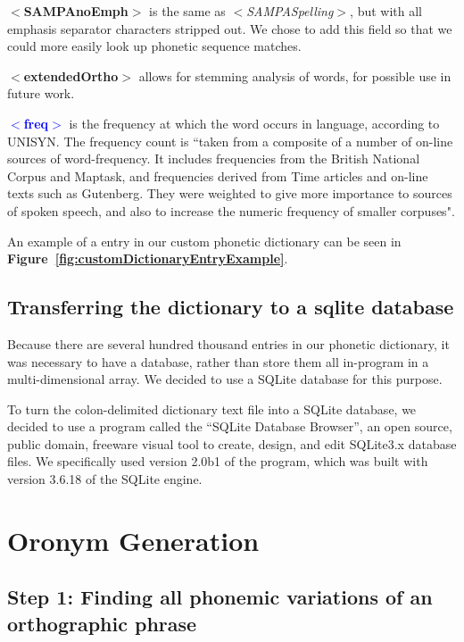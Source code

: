 \textcolor{Rhodamine}{$<$\textbf{SAMPAnoEmph}$>$} is the same as \emph{$<$SAMPASpelling$>$}, but with all emphasis separator characters stripped out.  We chose to add this field so that we could more easily look up phonetic sequence matches. 

\textcolor{Periwinkle}{$<$\textbf{extendedOrtho}$>$} allows for stemming analysis of words, for possible use in future work.

\textcolor{Blue}{$<$\textbf{freq}$>$} is the frequency at which the word occurs in language, according to UNISYN. The frequency count is ``taken from a composite of a number of on-line sources of word-frequency. It includes frequencies from the British National Corpus and Maptask, and frequencies derived from Time articles and on-line texts such as Gutenberg. They were weighted to give more importance to sources of spoken speech, and also to increase the numeric frequency of smaller corpuses"\cite{fitt_documentation_2000}.


An example of a entry in our custom phonetic dictionary can be seen in \textbf{Figure~\ref{fig:customDictionaryEntryExample}}.


\subsection{Transferring the dictionary to a sqlite database}
\label{subsection:transferringTheDictionaryToASqliteDatabase}

Because there are several hundred thousand entries in our phonetic dictionary, it was necessary to have a database, rather than store them all in-program in a multi-dimensional array.  We decided to use a SQLite database for this purpose.  

To turn the colon-delimited dictionary text file into a SQLite database, we decided to use a program called the ``SQLite Database Browser'', an open source, public domain, freeware visual tool to create, design, and edit SQLite3.x database files.  We specifically used version 2.0b1 of the program, which was built with version 3.6.18 of the SQLite engine\cite{sqliteDatabaseBrowser}.

\section{Oronym Generation}
\label{oronymGeneration}

\subsection{Step 1: Finding all phonemic variations of an orthographic phrase}
\label{subsection:stepOneFindAllSAMPAphrase}

